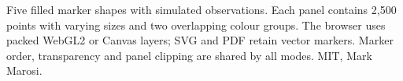 \caption{Five filled marker shapes with simulated observations. Each panel contains 2,500 points with varying sizes and two overlapping colour groups. The browser uses packed WebGL2 or Canvas layers; SVG and PDF retain vector markers. Marker order, transparency and panel clipping are shared by all modes. MIT, Mark Marosi.}
